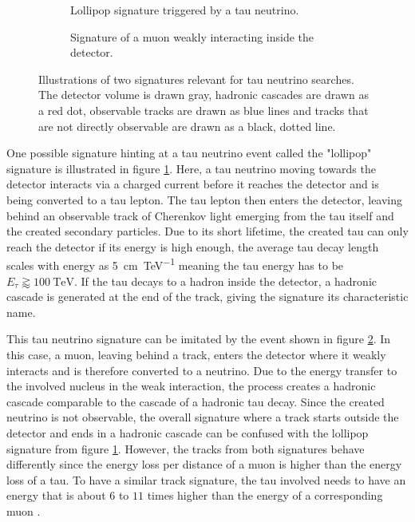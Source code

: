 \begin{figure}
    \centering
    \begin{subfigure}{0.46\textwidth}
        \centering
        
        \caption{Lollipop signature triggered by a tau neutrino.}
        \label{fig:lollipop_signature}
    \end{subfigure}%
    \hspace{0.06\textwidth}%
    \begin{subfigure}{0.46\textwidth}
        \centering
        
        \caption{Signature of a muon weakly interacting inside the detector.}
        \label{fig:weak_signature}
    \end{subfigure}
    \caption{Illustrations of two signatures relevant for tau neutrino searches. The detector volume is drawn gray, hadronic cascades are drawn as a red dot, observable tracks are drawn as blue lines and tracks that are not directly observable are drawn as a black, dotted line.}
    \label{fig:test}
\end{figure}

One possible signature hinting at a tau neutrino event called the "lollipop" signature is illustrated in figure \ref{fig:lollipop_signature}.
Here, a tau neutrino moving towards the detector interacts via a charged current before it reaches the detector and is being converted to a tau lepton.
The tau lepton then enters the detector, leaving behind an observable track of Cherenkov light emerging from the tau itself and the created secondary particles.
Due to its short lifetime, the created tau can only reach the detector if its energy is high enough, the average tau decay length scales with energy as \SI{5}{\cm\per\tera\electronvolt} \cite{Aartsen_2016} meaning the tau energy has to be $E_{\tau} \gtrapprox \SI{100}{\tera\electronvolt}$.
If the tau decays to a hadron inside the detector, a hadronic cascade is generated at the end of the track, giving the signature its characteristic name. 

This tau neutrino signature can be imitated by the event shown in figure \ref{fig:weak_signature}.
In this case, a muon, leaving behind a track, enters the detector where it weakly interacts and is therefore converted to a neutrino.
Due to the energy transfer to the involved nucleus in the weak interaction, the process creates a hadronic cascade comparable to the cascade of a hadronic tau decay.
Since the created neutrino is not observable, the overall signature where a track starts outside the detector and ends in a hadronic cascade can be confused with the lollipop signature from figure \ref{fig:lollipop_signature}.
However, the tracks from both signatures behave differently since the energy loss per distance of a muon is higher than the energy loss of a tau.
To have a similar track signature, the tau involved needs to have an energy that is about $\num{6}$ to $\num{11}$ times higher than the energy of a corresponding muon \cite{Sandrock:2018hpj}.


